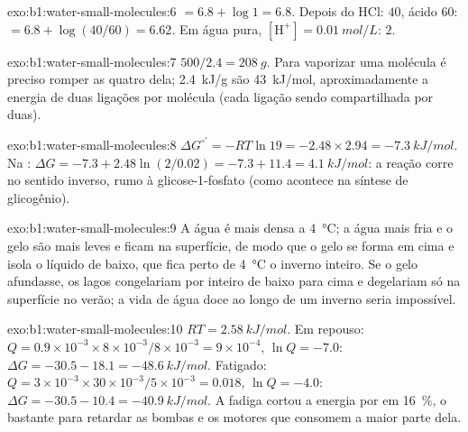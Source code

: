 \begin{solution}{exo:b1:water-small-molecules:6}
 $= 6.8 + \log 1 = 6.8$. Depois do HCl:  $40$, ácido $60$:  $= 6.8 +
\log(40/60) = 6.62$. Em água pura, $[\mathrm{H^+}] = \qty{0.01}{mol/L}$:
 $2$.
\end{solution}

\begin{solution}{exo:b1:water-small-molecules:7}
$500/2.4 = \qty{208}{g}$. Para vaporizar uma molécula é preciso romper
as quatro  dela; \qty{2.4}{kJ/g} são
\qty{43}{kJ/mol}, aproximadamente a energia de duas ligações por
molécula (cada ligação sendo compartilhada por duas).
\end{solution}

\begin{solution}{exo:b1:water-small-molecules:8}
$\Delta G^{\circ\prime} = -RT\ln 19 = -2.48\times 2.94 =
\qty{-7.3}{kJ/mol}$. Na : $\Delta G = -7.3 + 2.48\ln(2/0.02) =
-7.3 + 11.4 = \qty{+4.1}{kJ/mol}$: a reação corre no sentido inverso,
rumo à glicose-1-fosfato (como acontece na síntese de glicogênio).
\end{solution}

\begin{solution}{exo:b1:water-small-molecules:9}
A água é mais densa a \qty{4}{\celsius}; a água mais fria e o gelo são
mais leves e ficam na superfície, de modo que o gelo se forma em cima e
isola o líquido de baixo, que fica perto de \qty{4}{\celsius} o inverno
inteiro. Se o gelo afundasse, os lagos congelariam por inteiro de baixo
para cima e degelariam só na superfície no verão; a vida de água doce ao
longo de um inverno seria impossível.
\end{solution}

\begin{solution}{exo:b1:water-small-molecules:10}
$RT = \qty{2.58}{kJ/mol}$. Em repouso: $Q = 0.9\times 10^{-3}\times 8\times
10^{-3}/8\times 10^{-3} = 9\times 10^{-4}$, $\ln Q = -7.0$: $\Delta G =
-30.5 - 18.1 = \qty{-48.6}{kJ/mol}$. Fatigado: $Q = 3\times 10^{-3}\times
30\times 10^{-3}/5\times 10^{-3} = 0.018$, $\ln Q = -4.0$: $\Delta G =
-30.5 - 10.4 = \qty{-40.9}{kJ/mol}$. A fadiga cortou a energia por 
em \qty{16}{\%}, o bastante para retardar as bombas e os motores que
consomem a maior parte dela.
\end{solution}


